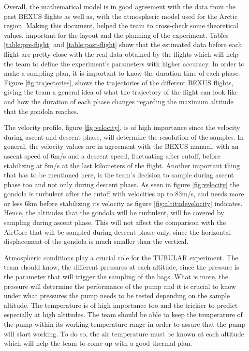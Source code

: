 Overall, the mathematical model is in good agreement with the data from the past BEXUS flights as well as, with the atmospheric model used for the Arctic region.
Making this document, helped the team to cross-check some theoretical values, important for the layout and the planning of the experiment. Tables \ref{table:pre-flight} and \ref{table:post-flight} show that the estimated data before each flight are pretty close with the real data obtained by the flights which will help the team to define the experiment's parameters with higher accuracy. 
In order to make a sampling plan, it is important to know the duration time of each phase. Figure \ref{fig:trajectories}, shows the trajectories of the different BEXUS flights, giving the team a general idea of what the trajectory of the flight can look like and how the duration of each phase changes regarding the maximum altitude that the gondola reaches.

The velocity profile, figure \ref{fig:velocity}, is of high importance since the velocity during ascent and descent phase, will determine the resolution of the samples. In general, the velocity values are in agreement with the BEXUS manual, with an ascent speed of 6m/s and a descent speed, fluctuating after cutoff, before stabilizing at 8m/s at the last kilometers of the flight. Another important thing that has to be mentioned here, is the team's decision to sample during ascent phase too and not only during descent phase. As seen in figure \ref{fig:velocity} the gondola is turbulent after the cutoff with velocities up to 83m/s, and needs more or less 6km before stabilizing its velocity as figure \ref{fig:altitudevelocity} indicates. Hence, the altitudes that the gondola will be turbulent, will be covered by sampling during ascent phase. This will not affect the comparison with the AirCore that will be sampled during descent phase only, since the horizontal displacement of the gondola is much smaller than the vertical. 

Atmospheric conditions play a crucial role for the TUBULAR experiment. The team should know, the different pressures at each altitude, since the pressure is the parameter that will trigger the sampling of the bags. What is more, the pressure will determine the performance of the pump and it is crucial to know under what pressures the pump needs to be tested depending on the sample altitude. The temperature is of high importance too and the trickier to predict especially at high altitudes. The team should be able to keep the temperature of the pump within its working temperature range in order to assure that the pump will start working. To do so, the air temperature must be known at each altitude which will help the team to come up with a good thermal plan. 

